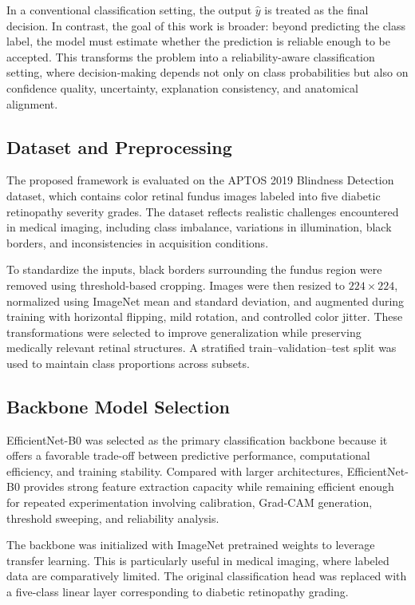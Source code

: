 \documentclass[conference]{IEEEtran}
\begin{document}
In a conventional classification setting, the output $\hat{y}$ is treated as the final decision. In contrast, the goal of this work is broader: beyond predicting the class label, the model must estimate whether the prediction is reliable enough to be accepted. This transforms the problem into a reliability-aware classification setting, where decision-making depends not only on class probabilities but also on confidence quality, uncertainty, explanation consistency, and anatomical alignment.

\subsection{Dataset and Preprocessing}
The proposed framework is evaluated on the APTOS 2019 Blindness Detection dataset, which contains color retinal fundus images labeled into five diabetic retinopathy severity grades. The dataset reflects realistic challenges encountered in medical imaging, including class imbalance, variations in illumination, black borders, and inconsistencies in acquisition conditions.

To standardize the inputs, black borders surrounding the fundus region were removed using threshold-based cropping. Images were then resized to $224 \times 224$, normalized using ImageNet mean and standard deviation, and augmented during training with horizontal flipping, mild rotation, and controlled color jitter. These transformations were selected to improve generalization while preserving medically relevant retinal structures. A stratified train--validation--test split was used to maintain class proportions across subsets.

\subsection{Backbone Model Selection}
EfficientNet-B0 was selected as the primary classification backbone because it offers a favorable trade-off between predictive performance, computational efficiency, and training stability. Compared with larger architectures, EfficientNet-B0 provides strong feature extraction capacity while remaining efficient enough for repeated experimentation involving calibration, Grad-CAM generation, threshold sweeping, and reliability analysis.

The backbone was initialized with ImageNet pretrained weights to leverage transfer learning. This is particularly useful in medical imaging, where labeled data are comparatively limited. The original classification head was replaced with a five-class linear layer corresponding to diabetic retinopathy grading.
\end{document}
